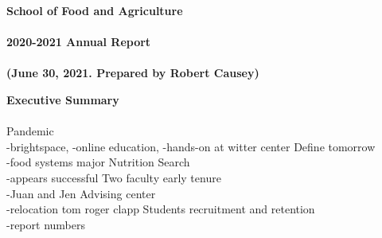 \documentclass[11pt]{article}
\begin{document}
\sloppy \rmfamily
\begin{center}\textbf{School of Food and Agriculture\\~\\2020-2021 Annual Report\\~\\(June 30, 2021. Prepared by Robert Causey)}\end{center}
\textbf{Executive Summary}\\~\\
Pandemic\\-brightspace, -online education, -hands-on at witter center
Define tomorrow\\-food systems major
Nutrition Search\\-appears successful
Two faculty early tenure\\-Juan and Jen
Advising center\\-relocation tom roger clapp
Students recruitment and retention\\-report numbers
\end{document}
